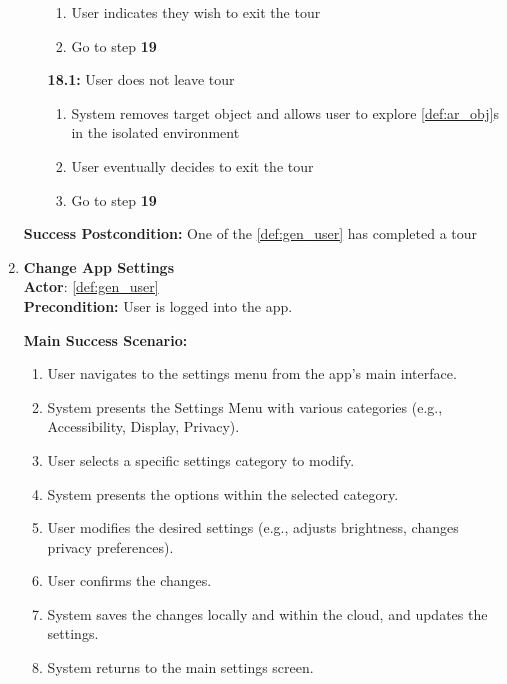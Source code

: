 \documentclass{article}
\begin{document}
\begin{enumerate}[label=\textbf{UC\arabic*}]
\begin{itemize}
            \begin{enumerate}[label=\textbf{\arabic*.}]
                \item User indicates they wish to exit the tour
                \item Go to step \textbf{19}
            \end{enumerate}
            \item[{\bf 18.1:}] User does not leave tour
            \begin{enumerate}[label=\textbf{\arabic*.}]
                \item System removes target object and allows user to explore \ref{def:ar_obj}s in the isolated environment
                \item User eventually decides to exit the tour
                \item Go to step \textbf{19}
            \end{enumerate}
        \end{itemize}
        \textbf{Success Postcondition:} One of the \ref{def:gen_user} has completed a tour

         \item \label{uc:13} \textbf{Change App Settings} \\
        \textbf{Actor}: \ref{def:gen_user} \\
        \textbf{Precondition:} User is logged into the app.
    
        \textbf{Main Success Scenario:}
        \begin{enumerate}[label=\textbf{\arabic*.}]
            \item User navigates to the settings menu from the app’s main interface.
            \item System presents the Settings Menu with various categories (e.g., Accessibility, Display, Privacy).
            \item User selects a specific settings category to modify.
            \item System presents the options within the selected category.
            \item User modifies the desired settings (e.g., adjusts brightness, changes privacy preferences).
            \item User confirms the changes.
            \item System saves the changes locally and within the cloud, and updates the settings.
            \item System returns to the main settings screen.
        \end{enumerate}
        

\end{enumerate}
\end{document}
